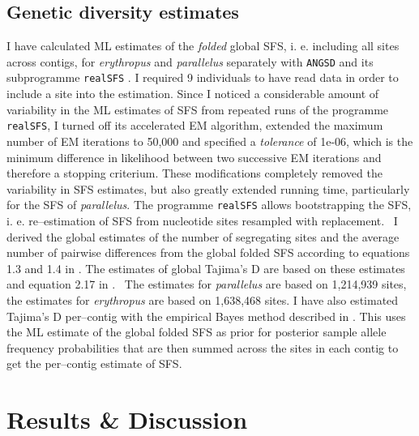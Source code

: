 \documentclass[a4paper,12pt,times,print,index,custombib,custommargin]{PhDThesisPSnPDF}\usepackage[]{graphicx}\usepackage[]{color}
\begin{document}
\subsection{Genetic diversity estimates}
%
%
I have calculated ML estimates of the \emph{folded} global \gls{SFS}, i. e. including all sites across contigs, for \textit{erythropus} and \textit{parallelus} separately with \texttt{ANGSD} and its subprogramme \texttt{realSFS} \citep{Korneliussen2014}. 
I required 9 individuals to have read data in order to include a site into the estimation. Since I noticed a considerable amount of variability in the ML estimates of SFS from repeated runs of the programme \texttt{realSFS}, I turned off its accelerated \gls{EM} algorithm, extended the maximum number of \gls{EM} iterations to 50,000 and specified a \textit{tolerance} of 1e-06, which is the minimum difference in likelihood between two successive \gls{EM} iterations and therefore a stopping criterium. These modifications completely removed the variability in SFS estimates, but also greatly extended running time, particularly for the \gls{SFS} of \textit{parallelus}. The programme \texttt{realSFS} allows bootstrapping the \gls{SFS}, i. e. re--estimation of \gls{SFS} from nucleotide sites resampled with replacement.~ I derived the global estimates of the number of segregating sites and the average number of pairwise differences from the global folded \gls{SFS} according to equations 1.3 and 1.4 in \cite{Wakeley2009}. The estimates of global Tajima's D are based on these estimates and equation 2.17 in \cite{Gillespie2004}. ~The estimates for \textit{parallelus} are based on 1,214,939 sites, the estimates for \textit{erythropus} are based on 1,638,468 sites. I have also estimated Tajima's D per--contig with the empirical Bayes method described in \cite{Korneliussen2014}. This uses the ML estimate of the global folded \gls{SFS} as prior for posterior sample allele frequency probabilities that are then summed across the sites in each contig to get the per--contig estimate of \gls{SFS}.

%
%
%
\section{Results \& Discussion}
%
%
%
\end{document}
